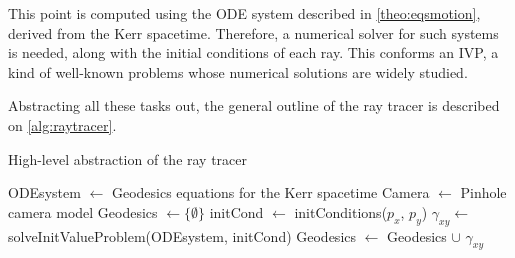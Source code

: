 This point is computed using the \ac{ODE} system described in \autoref{theo:eqsmotion}, derived from the Kerr spacetime. Therefore, a numerical solver for such systems is needed, along with the initial conditions of each ray. This conforms an \ac{IVP}, a kind of well-known problems whose numerical solutions are widely studied.

Abstracting all these tasks out, the general outline of the ray tracer is described on \autoref{alg:raytracer}.

\begin{algorithm}
	\caption{High-level abstraction of the ray tracer}
	\label{alg:raytracer}
	\begin{algorithmic}[1]
		\State ODEsystem $\gets$ Geodesics equations for the Kerr spacetime
		\State Camera $\gets$ Pinhole camera model
		\State Geodesics $\gets \{\emptyset\}$
			\State initCond $\gets$ initConditions($p_x$, $p_y$)
			\State $\gamma_{xy} \gets$ solveInitValueProblem(ODEsystem, initCond)
			\State Geodesics $\gets$ Geodesics $\cup$ $\gamma_{xy}$
		\EndFor
	\EndFunction
	\end{algorithmic}
\end{algorithm}

